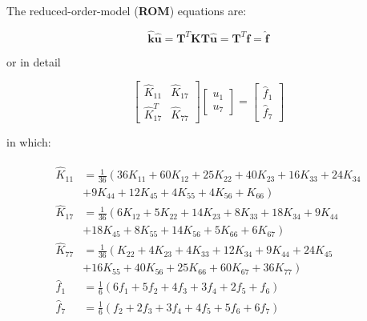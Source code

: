 \documentclass[10pt,b5paper,titlepage]{book}
\newenvironment{eqarray}
{
    \begin{eqnarray}
        \begin{aligned}
}
{
        \end{aligned}
    \end{eqnarray}
}
\begin{document}
The reduced-order-model (\textbf{ROM}) equations are:

\begin{equation}
    \mathbf{\hat{k}} \mathbf{\hat{u}}
    = \mathbf{T}^T \mathbf{K} \mathbf{T} \mathbf{\hat{u}}
    = \mathbf{T}^T \mathbf{f}
    = \mathbf{\hat{f}}
\end{equation}

or in detail

\begin{equation}
    \begin{bmatrix}
        \hat{K}_{11} & \hat{K}_{17} \\
        \hat{K}_{17}^T & \hat{K}_{77}
    \end{bmatrix}
    \begin{bmatrix}
        u_1 \\
        u_7
    \end{bmatrix}
    = \begin{bmatrix}
        \hat{f}_1 \\
        \hat{f}_7
    \end{bmatrix}
\end{equation}

in which:

\begin{eqarray}
    \hat{K}_{11} &= \frac{1}{36}
    \left( 36 K_{11} + 60 K_{12} + 25 K_{22} + 40 K_{23} + 16 K_{33} + 24 K_{34} \right. \\
                 &+  \left. 9 K_{44} + 12 K_{45} + 4 K_{55} + 4 K_{56} + K_{66} \right) \\
    \hat{K}_{17} &= \frac{1}{36}
    \left( 6 K_{12} + 5 K_{22} + 14 K_{23} + 8 K_{33} + 18 K_{34} + 9 K_{44} \right. \\
                 &+ \left. 18 K_{45} + 8 K_{55} + 14 K_{56} + 5 K_{66} + 6 K_{67} \right) \\
    \hat{K}_{77} &= \frac{1}{36}
    \left( K_{22} + 4 K_{23} + 4 K_{33} + 12 K_{34} + 9 K_{44} + 24 K_{45} \right. \\
                 &+ \left. 16 K_{55} + 40 K_{56} + 25 K_{66} + 60 K_{67} + 36 K_{77} \right) \\
    \hat{f}_1 & = \frac{1}{6}
    \left(
        6 f_1 + 5 f_2 + 4 f_3 + 3 f_4 + 2 f_5 + f_6
    \right) \\
    \hat{f}_7 & = \frac{1}{6}
    \left(
        f_2 + 2 f_3 + 3 f_4 + 4 f_5 + 5 f_6 + 6 f_7
    \right) \\
\end{eqarray}
\end{document}
